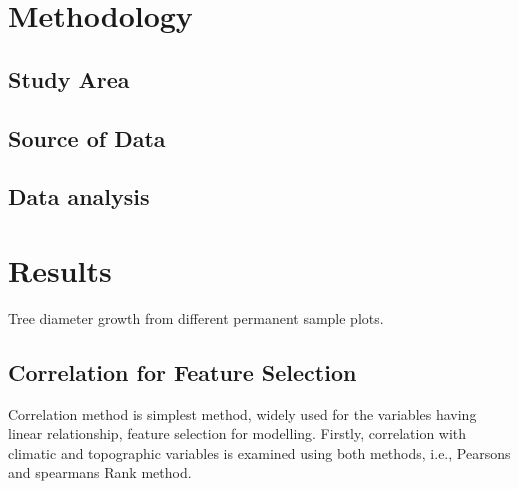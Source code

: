 \documentclass[
]{article}
\begin{document}
\newpage

\newpage
\fontsize{12}{18}
\tableofcontents

\newpage

\listoftables
\listoffigures

\newpage

\clearpage
{}
\fontsize{12}{18}

\hypertarget{methodology}{%
\section{Methodology}\label{methodology}}

\hypertarget{study-area}{%
\subsection{Study Area}\label{study-area}}

\hypertarget{source-of-data}{%
\subsection{Source of Data}\label{source-of-data}}

\hypertarget{data-analysis}{%
\subsection{Data analysis}\label{data-analysis}}

\hypertarget{results}{%
\section{Results}\label{results}}

Tree diameter growth from different permanent sample plots.

\hypertarget{correlation-for-feature-selection}{%
\subsection{Correlation for Feature
Selection}\label{correlation-for-feature-selection}}

Correlation method is simplest method, widely used for the variables
having linear relationship, feature selection for modelling. Firstly,
correlation with climatic and topographic variables is examined using
both methods, i.e., Pearsons and spearmans Rank method.
\end{document}
